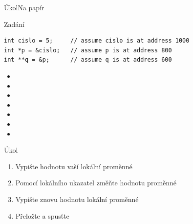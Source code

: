 \begin{frame}[fragile]{Úkol}{Na papír}

\begin{block}{Zadání}
\begin{lstlisting}
int cislo = 5;     // assume cislo is at address 1000
int *p = &cislo;   // assume p is at address 800
int **q = &p;      // assume q is at address 600
\end{lstlisting}
\end{block}

  \medskip

  \begin{itemize}
    \item {} %
    \item {} %
    \item {} %
    \item {} %
    \item {} %
    \item {} %
    \item {} %
  \end{itemize}

\end{frame}

\begin{frame}{Úkol}

  \begin{enumerate}
    \item Vypište hodnotu vaší lokální proměnné
    \item Pomocí lokálního ukazatel změňte hodnotu proměnné
    \item Vypište znovu hodnotu lokální proměnné
    \item Přeložte a spusťte
  \end{enumerate}

\end{frame}

